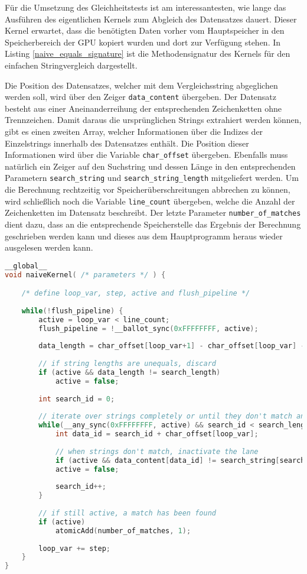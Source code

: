 Für die Umsetzung des Gleichheitstests ist am interessantesten, wie lange das Ausführen des eigentlichen Kernels zum Abgleich des Datensatzes dauert.
Dieser Kernel erwartet, dass die benötigten Daten vorher vom Hauptspeicher in den Speicherbereich der GPU kopiert wurden und dort zur Verfügung stehen.
In Listing \ref{naive_equals_signature} ist die Methodensignatur des Kernels für den einfachen Stringvergleich dargestellt.

Die Position des Datensatzes, welcher mit dem Vergleichsstring abgeglichen werden soll, wird über den Zeiger \texttt{data\_content} übergeben.
Der Datensatz besteht aus einer Aneinanderreihung der entsprechenden Zeichenketten ohne Trennzeichen.
Damit daraus die ursprünglichen Strings extrahiert werden können, gibt es einen zweiten Array, welcher Informationen über die Indizes der Einzelstrings innerhalb des Datensatzes enthält.
Die Position dieser Informationen wird über die Variable \texttt{char\_offset} übergeben.
Ebenfalls muss natürlich ein Zeiger auf den Suchstring und dessen Länge in den entsprechenden Parametern \texttt{search\_string} und \texttt{search\_string\_length} mitgeliefert werden.
Um die Berechnung rechtzeitig vor Speicherüberschreitungen abbrechen zu können, wird schließlich noch die Variable \texttt{line\_count} übergeben, welche die Anzahl der Zeichenketten im Datensatz beschreibt.
Der letzte Parameter \texttt{number\_of\_matches} dient dazu, dass an die entsprechende Speicherstelle das Ergebnis der Berechnung geschrieben werden kann und dieses aus dem Hauptprogramm heraus wieder ausgelesen werden kann.

\newpage

\begin{lstlisting}[language=C++,
	caption=Naive Implementierung des String-Vergleichs,
	label=naive_equals]
__global__
void naiveKernel( /* parameters */ ) {

	/* define loop_var, step, active and flush_pipeline */
	
	while(!flush_pipeline) {
		active = loop_var < line_count;
		flush_pipeline = !__ballot_sync(0xFFFFFFFF, active);
		
		data_length = char_offset[loop_var+1] - char_offset[loop_var] - 1;
		
		// if string lengths are unequals, discard
		if (active && data_length != search_length)
			active = false;
		
		int search_id = 0;
		
		// iterate over strings completely or until they don't match anymore
		while(__any_sync(0xFFFFFFFF, active) && search_id < search_length) {
			int data_id = search_id + char_offset[loop_var];
			
			// when strings don't match, inactivate the lane
			if (active && data_content[data_id] != search_string[search_id])
			active = false;
			
			search_id++;
		}
		
		// if still active, a match has been found
		if (active)
			atomicAdd(number_of_matches, 1);
		
		loop_var += step;
	}
}
\end{lstlisting}

